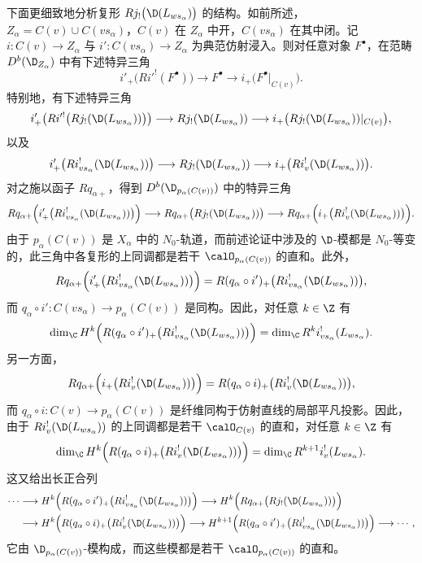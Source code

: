 下面更细致地分析复形 $Rj_!\bigl(\D(L_{ws_\alpha})\bigr)$ 的结构。如前所述，$Z_\alpha=C(v)\cup C(vs_\alpha)$，$C(v)$ 在 $Z_\alpha$ 中开，$C(vs_\alpha)$ 在其中闭。记 $i:C(v)\to Z_\alpha$ 与 $i':C(vs_\alpha)\to Z_\alpha$ 为典范仿射浸入。则对任意对象 $F^\bullet$，在范畴 $D^b(\D_{Z_\alpha})$ 中有下述特异三角
$$i'_+\bigl(Ri'^!(F^\bullet)\bigr)\longrightarrow F^\bullet\longrightarrow i_+\bigl(F^\bullet|_{C(v)}\bigr).$$
特别地，有下述特异三角
$$i'_+\bigl(Ri'^!\bigl(Rj_!(\D(L_{ws_\alpha}))\bigr)\bigr)\longrightarrow Rj_!(\D(L_{ws_\alpha}))\longrightarrow i_+\bigl(Rj_!(\D(L_{ws_\alpha}))|_{C(v)}\bigr),$$
以及
$$i'_+\bigl(Ri^!_{vs_\alpha}(\D(L_{ws_\alpha}))\bigr)\longrightarrow Rj_!(\D(L_{ws_\alpha}))\longrightarrow i_+\bigl(Ri^!_v(\D(L_{ws_\alpha}))\bigr).$$
对之施以函子 $Rq_{\alpha+}$，得到 $D^b(\D_{p_\alpha(C(v))})$ 中的特异三角
$$Rq_{\alpha+}\Bigl(i'_+\bigl(Ri^!_{vs_\alpha}(\D(L_{ws_\alpha}))\bigr)\Bigr)
\longrightarrow Rq_{\alpha+}\bigl(Rj_!(\D(L_{ws_\alpha}))\bigr)
\longrightarrow Rq_{\alpha+}\Bigl(i_+\bigl(Ri^!_v(\D(L_{ws_\alpha}))\bigr)\Bigr).$$
由于 $p_\alpha(C(v))$ 是 $X_\alpha$ 中的 $N_0$-轨道，而前述论证中涉及的 $\D$-模都是 $N_0$-等变的，此三角中各复形的上同调都是若干 $\calO_{p_\alpha(C(v))}$ 的直和。此外，
$$Rq_{\alpha+}\Bigl(i'_+\bigl(Ri^!_{vs_\alpha}(\D(L_{ws_\alpha}))\bigr)\Bigr)
=R(q_\alpha\circ i')_+\bigl(Ri^!_{vs_\alpha}(\D(L_{ws_\alpha}))\bigr),$$
而 $q_\alpha\circ i':C(vs_\alpha)\to p_\alpha(C(v))$ 是同构。因此，对任意 $k\in\Z$ 有
$$\dim_\C H^k\Bigl(R(q_\alpha\circ i')_+\bigl(Ri^!_{vs_\alpha}(\D(L_{ws_\alpha}))\bigr)\Bigr)
=\dim_\C R^ki^!_{vs_\alpha}(L_{ws_\alpha}).$$
另一方面，
$$Rq_{\alpha+}\Bigl(i_+\bigl(Ri^!_v(\D(L_{ws_\alpha}))\bigr)\Bigr)
=R(q_\alpha\circ i)_+\bigl(Ri^!_v(\D(L_{ws_\alpha}))\bigr),$$
而 $q_\alpha\circ i:C(v)\to p_\alpha(C(v))$ 是纤维同构于仿射直线的局部平凡投影。因此，由于 $Ri^!_v(\D(L_{ws_\alpha}))$ 的上同调都是若干 $\calO_{C(v)}$ 的直和，对任意 $k\in\Z$ 有
$$\dim_\C H^k\Bigl(R(q_\alpha\circ i)_+\bigl(Ri^!_v(\D(L_{ws_\alpha}))\bigr)\Bigr)
=\dim_\C R^{k+1}i^!_v(L_{ws_\alpha}).$$
这又给出长正合列
{\small
\begin{align*}
\cdots&\longrightarrow H^k\Bigl(R(q_\alpha\circ i')_+\bigl(Ri^!_{vs_\alpha}(\D(L_{ws_\alpha}))\bigr)\Bigr)
\longrightarrow H^k\Bigl(Rq_{\alpha+}\bigl(Rj_!(\D(L_{ws_\alpha}))\bigr)\Bigr)\\
&\longrightarrow H^k\Bigl(R(q_\alpha\circ i)_+\bigl(Ri^!_v(\D(L_{ws_\alpha}))\bigr)\Bigr)
\longrightarrow H^{k+1}\Bigl(R(q_\alpha\circ i')_+\bigl(Ri^!_{vs_\alpha}(\D(L_{ws_\alpha}))\bigr)\Bigr)
\longrightarrow\cdots,
\end{align*}
}
它由 $\D_{p_\alpha(C(v))}$-模构成，而这些模都是若干 $\calO_{p_\alpha(C(v))}$ 的直和。

